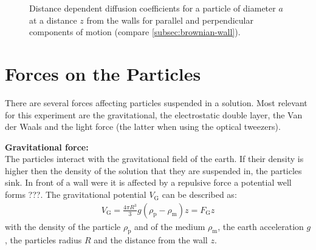 \documentclass[.../bericht]{subfilies}
\begin{document}
         \begin{figure}
           \centering
           \caption{Distance dependent diffusion coefficients for a particle of diameter $a$ at a distance $z$ from the walls for parallel and perpendicular components of motion (compare \cref{subsec:brownian-wall}).}
           \label{fig:D-wall}
         \end{figure}


      \section{Forces on the Particles}
      \label{sec:forces}

        There are several forces affecting particles suspended in a solution. Most relevant for this experiment are the gravitational, the electrostatic double layer, the Van der Waals and the light force (the latter when using the optical tweezers).
        \medskip

        \textbf{Gravitational force:}\\
        The particles interact with the gravitational field of the earth. If their density is higher then the density of the solution that they are suspended in, the particles sink. In front of a wall were it is affected by a repulsive force a potential well forms ???.  The gravitational potential $V_\mathrm{G}$ can be described as:
        \begin{align}
          V_\mathrm{G}=\frac{4\pi R^3}{3}g(\rho_\mathrm{p}-\rho_\mathrm{m})z=F_\mathrm{G}z
        \end{align}
        with the density of the particle $\rho_\mathrm{p}$ and of the medium $\rho_\mathrm{m}$, the earth acceleration $g$, the particles radius $R$ and the distance from the wall $z$.
        \medskip
\end{document}
